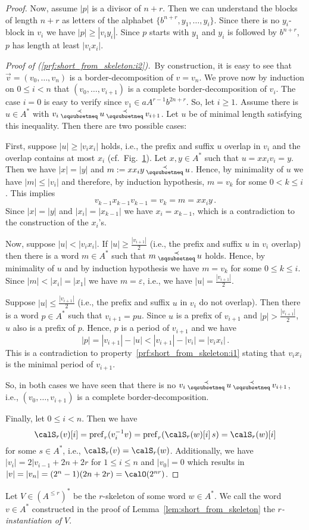 \begin{proof}
	Now, assume $|p|$ is a divisor of $n+r$. Then we can understand the blocks of length $n+r$ as letters of the alphabet $\{b^{n+r},y_1,\dots,y_i\}$. Since there is no $y_i$-block in $v_i$ we have $|p|\geq|v_iy_i|$. Since $p$ starts with $y_1$ and $y_i$ is followed by $b^{n+r}$, $p$ has length at least $|v_ix_i|$.
	
	\emph{Proof of (\ref{prf:short_from_skeleton:i2}).}\ By construction, it is easy to see that $\vec{v}=(v_0,\dots,v_n)$ is a border-decomposition of $v=v_n$. We prove now by induction on $0\leq i<n$ that $(v_0,\dots,v_{i+1})$ is a complete border-decomposition of $v_i$. The case $i=0$ is easy to verify since $v_1\in aA^{r-1}b^{2n+r}$. So, let $i\geq1$. Assume there is $u\in A^*$ with $v_i\presuf u\presuf v_{i+1}$. Let $u$ be of minimal length satisfying this inequality. Then there are two possible cases:
	
	First, suppose $|u|\geq|v_ix_i|$ holds, i.e., the prefix and suffix $u$ overlap in $v_i$ and the overlap contains at most $x_i$ (cf.\ Fig.~\ref{fig:skeleton}). Let $x,y\in A^*$ such that $u=xx_iv_i=y$. Then we have $|x|=|y|$ and $m:=xx_iy\presuf u$. Hence, by minimality of $u$ we have $|m|\leq|v_i|$ and therefore, by induction hypothesis, $m=v_k$ for some $0< k\leq i$. This implies
	\[v_{k-1}x_{k-1}v_{k-1}=v_k=m=xx_iy\,.\]
	Since $|x|=|y|$ and $|x_i|=|x_{k-1}|$ we have $x_i=x_{k-1}$, which is a contradiction to the construction of the $x_i$'s.
	
	\begin{figure}[h]
		\centering
		\caption{\label{fig:skeleton}}
	\end{figure}
	
	Now, suppose $|u|<|v_ix_i|$. If $|u|\geq\frac{|v_{i+1}|}{2}$ (i.e., the prefix and suffix $u$ in $v_i$ overlap) then there is a word $m\in A^*$ such that $m\presuf u$ holds. Hence, by minimality of $u$ and by induction hypothesis we have $m=v_k$ for some $0\leq k\leq i$. Since $|m|<|x_i|=|x_1|$ we have $m=\varepsilon$, i.e., we have $|u|=\frac{|v_{i+1}|}{2}$.
	
	Suppose $|u|\leq\frac{|v_{i+1}|}{2}$ (i.e., the prefix and suffix $u$ in $v_i$ do not overlap). Then there is a word $p\in A^*$ such that $v_{i+1}=pu$. Since $u$ is a prefix of $v_{i+1}$ and $|p|>\frac{|v_{i+1}|}{2}$, $u$ also is a prefix of $p$. Hence, $p$ is a period of $v_{i+1}$ and we have
	\[|p|=|v_{i+1}|-|u|<|v_{i+1}|-|v_i|=|v_ix_i|\,.\]
	This is a contradiction to property~\ref{prf:short_from_skeleton:i1} stating that $v_ix_i$ is the minimal period of $v_{i+1}$.
	
	So, in both cases we have seen that there is no $v_i\presuf u\presuf v_{i+1}$, i.e., $(v_0,\dots,v_{i+1})$ is a complete border-decomposition.
	
	Finally, let $0\leq i<n$. Then we have
	\[\calS_r(v)[i]=\pref_r(\inv{v_i}v)=\pref_r(\calS_r(w)[i]\,s)=\calS_r(w)[i]\]
	for some $s\in A^*$, i.e., $\calS_r(v)=\calS_r(w)$. Additionally, we have $|v_i|=2|v_{i-1}+2n+2r$ for $1\leq i\leq n$ and $|v_0|=0$ which results in $|v|=|v_n|=(2^n-1)(2n+2r)=\calO(2^{nr})$.
\end{proof}

Let $V\in (A^{\leq r})^*$ be the $r$-skeleton of some word $w\in A^*$. We call the word $v\in A^*$ constructed in the proof of Lemma~\ref{lem:short_from_skeleton} the \emph{$r$-instantiation of $V$}.